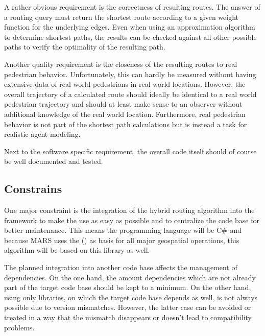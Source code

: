 		A rather obvious requirement is the correctness of resulting routes.
		The answer of a routing query must return the shortest route according to a given weight function for the underlying edges.
		Even when using an approximation algorithm to determine shortest paths, the results can be checked against all other possible paths to verify the optimality of the resulting path.
		
		Another quality requirement is the closeness of the resulting routes to real pedestrian behavior.
		Unfortunately, this can hardly be measured without having extensive data of real world pedestrians in real world locations.
		However, the overall trajectory of a calculated route should ideally be identical to a real world pedestrian trajectory and should at least make sense to an observer without additional knowledge of the real world location.
		Furthermore, real pedestrian behavior is not part of the shortest path calculations but is instead a task for realistic agent modeling.

		Next to the software specific requirement, the overall code itself should of course be well documented and tested.
	
	\subsection{Constrains}
	\label{subsec:constrains}
		
		One major constraint is the integration of the hybrid routing algorithm into the  framework to make the use as easy as possible and to centralize the code base for better maintenance.
		This means the programming language will be C\# and because MARS uses the  () as basis for all major geospatial operations, this algorithm will be based on this library as well.
		
		The planned integration into another code base affects the management of dependencies.
		On the one hand, the amount dependencies which are not already part of the target code base should be kept to a minimum.
		On the other hand, using only libraries, on which the target code base depends as well, is not always possible due to version mismatches.
		However, the latter case can be avoided or treated in a way that the mismatch disappears or doesn't lead to compatibility problems.
	
	
